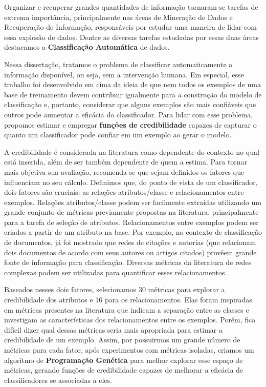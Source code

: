 Organizar e recuperar grandes quantidades de informação tornaram-se tarefas de extrema importância, principalmente nas áreas de Mineração de Dados e Recuperação de Informação, responsáveis por estudar uma maneira de lidar com essa explosão de dados. Dentre as diversas tarefas estudadas por essas duas áreas destacamos a \textbf{Classificação Automática} de dados.

Nessa dissertação, tratamos o problema de classificar automaticamente a informação disponível, ou seja, sem a intervenção humana.
Em especial, esse trabalho foi desenvolvido em cima da ideia de que nem todos os exemplos de uma base de treinamento devem contribuir igualmente para a construção do modelo de classificação e, portanto, considerar que alguns exemplos são mais confiáveis que outros pode aumentar a eficácia do classificador.
Para lidar com esse problema, propomos estimar e empregar \textbf{funções de credibilidade} capazes de capturar o quanto um classificador pode confiar em um exemplo ao gerar o modelo.

A credibilidade é considerada na literatura como dependente do contexto no qual está inserida, além de ser também dependente de quem a estima.
Para tornar mais objetiva sua avaliação, recomenda-se que sejam definidos os fatores que influenciam no seu cálculo.
Definimos que, do ponto de vista de um classificador, dois fatores são cruciais: as relações atributos/classe e relacionamentos entre exemplos. Relações atributos/classe podem ser facilmente extraídas utilizando um grande conjunto de métricas previamente propostas na literatura, principalmente para a tarefa de seleção de atributos. Relacionamentos entre exemplos podem ser criados a partir de um atributo na base. Por exemplo, no contexto de classificação de documentos, já foi mostrado que redes de citações e autorias (que relacionam dois documentos de acordo com seus autores ou artigos citados) provêem grande fonte de informação para classificação. Diversas métricas da literatura de redes complexas podem ser utilizadas para quantificar esses relacionamentos.

Baseados nesses dois fatores, selecionamos 30 métricas para explorar a
credibilidade dos atributos e 16 para os relacionamentos. Elas foram inspiradas
em métricas presentes na literatura que indicam a separação entre as classes e
investigam as características dos relacionamentos entre os exemplos. Porém, fica
difícil dizer qual dessas métricas seria mais apropriada para estimar a
credibilidade de um exemplo. Assim, por possuirmos um grande número de métricas
para cada fator, após experimentos com métricas isoladas, criamos um algoritmo de \textbf{Programação Genética} para melhor explorar esse espaço de métricas, gerando funções de credibilidade capazes de melhorar a eficácia de classificadores se associadas a eles.

